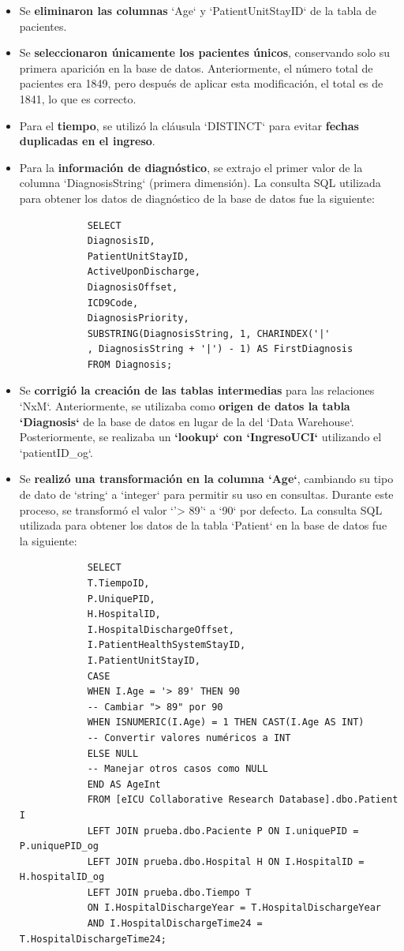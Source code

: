 \documentclass[12pt, a4paper, twoside]{article}
\begin{document}
	\begin{itemize}
		\item Se \textbf{eliminaron las columnas} `Age` y `PatientUnitStayID` de la tabla de pacientes.
		\item Se \textbf{seleccionaron únicamente los pacientes únicos}, conservando solo su primera aparición en la base de datos. Anteriormente, el número total de pacientes era 1849, pero después de aplicar esta modificación, el total es de 1841, lo que es correcto.
		\item Para el \textbf{tiempo}, se utilizó la cláusula `DISTINCT` para evitar \textbf{fechas duplicadas en el ingreso}.
		\item Para la \textbf{información de diagnóstico}, se extrajo el primer valor de la columna `DiagnosisString` (primera dimensión). La consulta SQL utilizada para obtener los datos de diagnóstico de la base de datos fue la siguiente:
		\begin{verbatim}
			SELECT 
			DiagnosisID,
			PatientUnitStayID,
			ActiveUponDischarge,
			DiagnosisOffset,
			ICD9Code,
			DiagnosisPriority,
			SUBSTRING(DiagnosisString, 1, CHARINDEX('|'
			, DiagnosisString + '|') - 1) AS FirstDiagnosis
			FROM Diagnosis;
		\end{verbatim}
		\item Se \textbf{corrigió la creación de las tablas intermedias} para las relaciones `NxM`. Anteriormente, se utilizaba como \textbf{origen de datos la tabla `Diagnosis`} de la base de datos en lugar de la del `Data Warehouse`. Posteriormente, se realizaba un \textbf{`lookup` con `IngresoUCI`} utilizando el `patientID\_og`.
		\item Se \textbf{realizó una transformación en la columna `Age`}, cambiando su tipo de dato de `string` a `integer` para permitir su uso en consultas. Durante este proceso, se transformó el valor `'> 89'` a `90` por defecto. La consulta SQL utilizada para obtener los datos de la tabla `Patient` en la base de datos fue la siguiente:
		\begin{verbatim}
			SELECT 
			T.TiempoID,
			P.UniquePID,
			H.HospitalID,
			I.HospitalDischargeOffset,
			I.PatientHealthSystemStayID,
			I.PatientUnitStayID,
			CASE 
			WHEN I.Age = '> 89' THEN 90                      
			-- Cambiar "> 89" por 90
			WHEN ISNUMERIC(I.Age) = 1 THEN CAST(I.Age AS INT) 
			-- Convertir valores numéricos a INT
			ELSE NULL                                       
			-- Manejar otros casos como NULL
			END AS AgeInt
			FROM [eICU Collaborative Research Database].dbo.Patient I
			LEFT JOIN prueba.dbo.Paciente P ON I.uniquePID = P.uniquePID_og
			LEFT JOIN prueba.dbo.Hospital H ON I.HospitalID = H.hospitalID_og
			LEFT JOIN prueba.dbo.Tiempo T 
			ON I.HospitalDischargeYear = T.HospitalDischargeYear 
			AND I.HospitalDischargeTime24 = T.HospitalDischargeTime24;
		\end{verbatim}
	\end{itemize}
	
\end{document}
